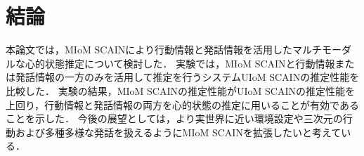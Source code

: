 \chapter{結論}
本論文では，MIoM SCAINにより行動情報と発話情報を活用したマルチモーダルな心的状態推定について検討した．
実験では，MIoM SCAINと行動情報または発話情報の一方のみを活用して推定を行うシステムUIoM SCAINの推定性能を比較した．
実験の結果，MIoM SCAINの推定性能がUIoM SCAINの推定性能を上回り，行動情報と発話情報の両方を心的状態の推定に用いることが有効であることを示した．
今後の展望としては，より実世界に近い環境設定や三次元の行動および多種多様な発話を扱えるようにMIoM SCAINを拡張したいと考えている．

